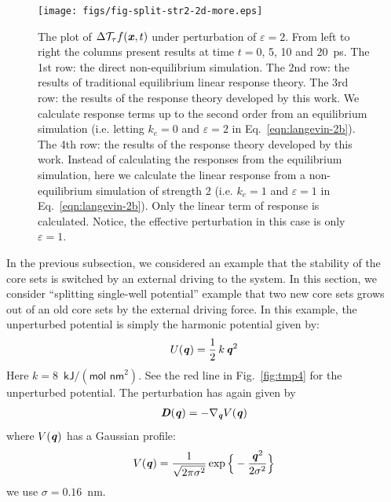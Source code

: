\documentclass[aip,jcp,a4paper,reprint,onecolumn]{revtex4-1}
\newcommand{\vect}[1]{\textbf{\textit{#1}}}
\newcommand{\eps}{\varepsilon}
\newcommand{\mt}{\mathcal T}
\begin{document}

\begin{figure}
  \centering
  \texttt{[image: figs/fig-split-str2-2d-more.eps]}
  \caption{
    The plot of $\Delta\mt_\tau f(\vect x,t)$  under perturbation of
    $\eps = 2$. From left to right the
    columns present results at time $t = 0$, 5, 10 and
    20~\textsf{ps}.
    The 1st row: the direct non-equilibrium
    simulation. The 2nd row: the results of traditional equilibrium
    linear response theory.  The 3rd row: the results of the response
    theory developed by this work.  We calculate response terms up to
    the second order from an equilibrium simulation (i.e. letting $k_e
    = 0$ and $\eps = 2$ in Eq.~\eqref{eqn:langevin-2b}).
    The 4th row: the results of the response theory developed by this work.
    Instead of calculating the responses from the equilibrium simulation,
    here we calculate the linear response from a non-equilibrium simulation
    of strength 2 (i.e. $k_e = 1$ and $\eps = 1$
    in Eq.~\eqref{eqn:langevin-2b}).
    Only the linear term of response is calculated.
    Notice, the effective perturbation in this case is only
    $\eps = 1$.
  }
  \label{fig:tmp6}
\end{figure}

In the previous subsection, we considered an example that the stability of the
core sets is switched by an external driving to the system.
In this section, we consider ``splitting single-well potential'' example
that two new core sets grows out of 
an old core sets by the external driving force.
In this example, the unperturbed
potential is simply the harmonic potential given by:
\begin{align}
  U(\vect q) = \frac12\,k\,\vect q^2 
\end{align}
Here $k = 8$~$\textsf{kJ} / (\textsf{mol nm}^2)$.
See the red line in Fig.~\ref{fig:tmp4} for the unperturbed potential.
The perturbation has again given by
\begin{align}
  \vect D(\vect q) = -\nabla_{\vect q} V(\vect q) 
\end{align}
where $V(\vect q)$ has a Gaussian profile:
\begin{align}
  V(\vect q) = \frac{1}{\sqrt{2\pi \sigma^2}}
  \exp\Big\{-\frac{\vect q^2}{2\sigma^2}\Big\}
\end{align}
we use $\sigma = 0.16$~\textsf{nm}.
\end{document}
